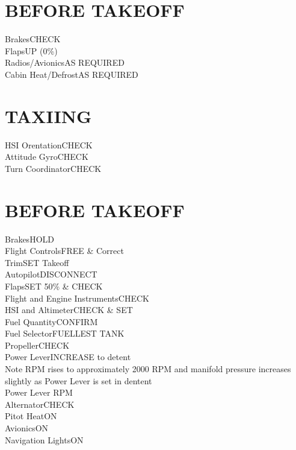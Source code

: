 \documentclass{article}
\begin{document}
\begin{multicols*}{2}
\section*{BEFORE TAKEOFF}
Brakes\dotfill CHECK\\
Flaps\dotfill UP (0\%)\\
Radios/Avionics\dotfill AS REQUIRED\\
Cabin Heat/Defrost\dotfill AS REQUIRED
\section*{TAXIING}
HSI Orentation\dotfill CHECK\\
Attitude Gyro\dotfill CHECK\\
Turn Coordinator\dotfill CHECK
\section*{BEFORE TAKEOFF}
Brakes\dotfill HOLD\\
Flight Controls\dotfill FREE \& Correct\\
Trim\dotfill SET Takeoff\\
Autopilot\dotfill DISCONNECT\\
Flaps\dotfill SET 50\% \& CHECK\\
Flight and Engine Instruments\dotfill CHECK\\
HSI and Altimeter\dotfill CHECK \& SET\\
Fuel Quantity\dotfill CONFIRM\\
Fuel Selector\dotfill FUELLEST TANK\\
Propeller\dotfill CHECK\\
\hspace*{6mm} Power Lever\dotfill INCREASE to detent\\
\hspace*{6mm} Note RPM rises to approximately 2000 RPM and manifold pressure increases slightly as Power Lever is set in dentent\\
\hspace*{6mm} Power Lever RPM\\
Alternator\dotfill CHECK\\
\hspace*{6mm} Pitot Heat\dotfill ON\\
\hspace*{6mm} Avionics\dotfill ON\\
\hspace*{6mm} Navigation Lights\dotfill ON\\

\end{multicols*}
\end{document}
